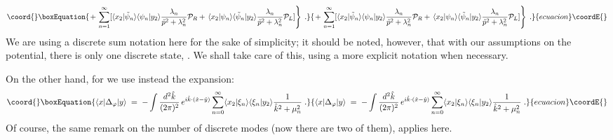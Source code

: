 \documentclass[a4paper,12pt]{article}
\begin{document}
\begin{equation}\coord{}\boxEquation{
  \label{eq:ferexp}
\left. +\,\sum_{n=1}^\infty [\langle x_2|{\tilde \psi}_n\rangle
\langle\psi_n|y_2\rangle \frac{\lambda_n}{{\hat p}^2+\lambda_n^2} 
{\mathcal P}_R +\,\langle x_2|\psi_n\rangle \langle{\tilde \psi}_n|y_2\rangle 
\frac{\lambda_n}{{\hat p}^2+\lambda_n^2} 
{\mathcal P}_L ] \right\} \;.
}{
  \left. +\,\sum_{n=1}^\infty [\langle x_2|{\tilde \psi}_n\rangle
\langle\psi_n|y_2\rangle \frac{\lambda_n}{{\hat p}^2+\lambda_n^2} 
{\mathcal P}_R +\,\langle x_2|\psi_n\rangle \langle{\tilde \psi}_n|y_2\rangle 
\frac{\lambda_n}{{\hat p}^2+\lambda_n^2} 
{\mathcal P}_L ] \right\} \;.
}{ecuacion}\coordE{}\end{equation}
We are using a discrete sum notation here for the sake of simplicity;
it should be noted, however, that with our assumptions on the potential,
there is only one discrete state, \coordHE{}. We shall take care of this,
using a more explicit notation when necessary.

On the other hand, for \myHighlight{$\Delta_\varphi$}\coordHE{} we use instead the expansion:
\begin{equation}\coord{}\boxEquation{
  \label{eq:bosexp}
\langle x|\Delta_\varphi|y\rangle \;=\; - \int \frac{d^2{\hat k}}{(2\pi)^2} \,
e^{i {\hat k}\cdot({\hat x}-{\hat y})}
\sum_{n=0}^\infty \langle x_2|\xi_n\rangle \langle\xi_n|y_2\rangle 
\frac{1}{{\hat k}^2 + \mu_n^2}\;.
}{
  \langle x|\Delta_\varphi|y\rangle \;=\; - \int \frac{d^2{\hat k}}{(2\pi)^2} \,
e^{i {\hat k}\cdot({\hat x}-{\hat y})}
\sum_{n=0}^\infty \langle x_2|\xi_n\rangle \langle\xi_n|y_2\rangle 
\frac{1}{{\hat k}^2 + \mu_n^2}\;.
}{ecuacion}\coordE{}\end{equation}
Of course, the same remark on the number of discrete modes
(now there are two of them), applies here.
\end{document}
